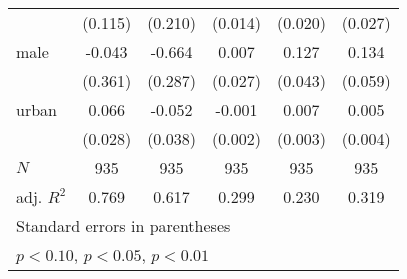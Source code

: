 {\begin{tabular}{l*{5}{c}}
            &     (0.115)         &     (0.210)         &     (0.014)         &     (0.020)         &     (0.027)         \\
[1em]
male        &      -0.043         &      -0.664\sym{**} &       0.007         &       0.127\sym{***}&       0.134\sym{**} \\
            &     (0.361)         &     (0.287)         &     (0.027)         &     (0.043)         &     (0.059)         \\
[1em]
urban       &       0.066\sym{**} &      -0.052         &      -0.001         &       0.007\sym{**} &       0.005         \\
            &     (0.028)         &     (0.038)         &     (0.002)         &     (0.003)         &     (0.004)         \\
\hline
\(N\)       &         935         &         935         &         935         &         935         &         935         \\
adj. \(R^{2}\)&       0.769         &       0.617         &       0.299         &       0.230         &       0.319         \\
\hline\hline
\multicolumn{6}{l}{\footnotesize Standard errors in parentheses}\\
\multicolumn{6}{l}{\footnotesize \sym{*} \(p<0.10\), \sym{**} \(p<0.05\), \sym{***} \(p<0.01\)}\\
\end{tabular}
}
